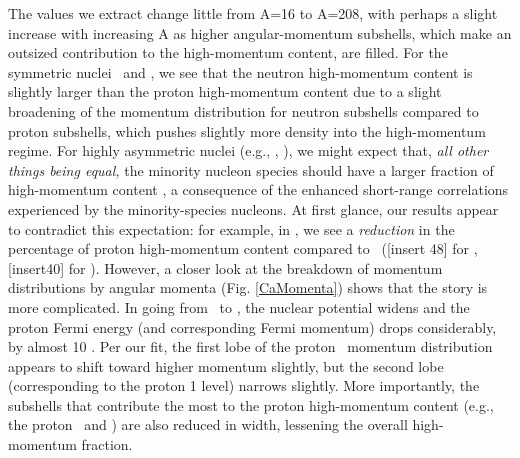The values we extract change little from A=16 to A=208, with perhaps a slight
increase with increasing A as higher angular-momentum subshells, which make an
outsized contribution to the high-momentum content, are filled.
For the symmetric nuclei \oSix\ and \caForty, we see that the neutron high-momentum
content is slightly larger than the proton high-momentum content due to a slight
broadening of the momentum distribution for neutron subshells compared to proton
subshells, which pushes slightly
more density into the high-momentum regime. For highly asymmetric
nuclei (e.g., \snFour, \pbEight), we might expect that, \textit{all other things
being equal,} the minority nucleon species should have a
larger fraction of high-momentum content \cite{Subedi2008, Hen2012},
a consequence of the enhanced
short-range correlations experienced by the minority-species nucleons. At first
glance, our results appear to contradict this expectation: for example, in \caEight, we see a
\textit{reduction} in the percentage of proton high-momentum content compared to \caForty\
([insert 48] for \caEight, [insert40] for \caForty). However, a closer look at
the breakdown of momentum distributions by angular momenta (Fig.
\ref{CaMomenta}) shows that the story is more complicated. In going from
\caForty\ to \caEight, the nuclear potential widens and
the proton Fermi energy (and corresponding Fermi momentum) drops considerably,
by almost 10 \mega\electronvolt. Per our fit, the first lobe
of the proton \sOne\ momentum distribution appears to shift toward higher
momentum slightly, but the second lobe (corresponding to the proton 1\sOne
level) narrows slightly. More importantly, the subshells that contribute
the most to the proton high-momentum content
(e.g., the proton \dFive\ and \fSeven) are also reduced in width, lessening the
overall high-momentum fraction.

